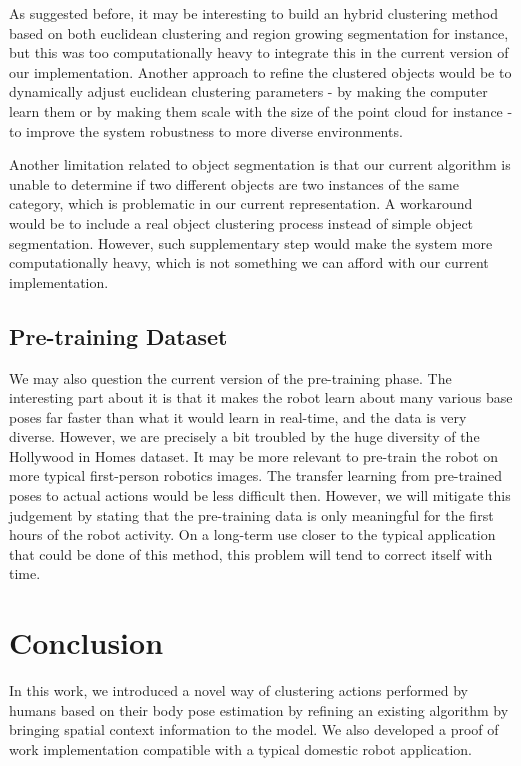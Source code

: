 As suggested before, it may be interesting to build an hybrid clustering method based on both euclidean clustering and region growing segmentation for instance, but this was too computationally heavy to integrate this in the current version of our implementation. Another approach to refine the clustered objects would be to dynamically adjust euclidean clustering parameters - by making the computer learn them or by making them scale with the size of the point cloud for instance - to improve the system robustness to more diverse environments.

Another limitation related to object segmentation is that our current algorithm is unable to determine if two different objects are two instances of the same category, which is problematic in our current representation. A workaround would be to include a real object clustering process instead of simple object segmentation. However, such supplementary step would make the system more computationally heavy, which is not something we can afford with our current implementation.

\subsection{Pre-training Dataset}
We may also question the current version of the pre-training phase. The interesting part about it is that it makes the robot learn about many various base poses far faster than what it would learn in real-time, and the data is very diverse. However, we are precisely a bit troubled by the huge diversity of the Hollywood in Homes dataset. It may be more relevant to pre-train the robot on more typical first-person robotics images. The transfer learning from pre-trained poses to actual actions would be less difficult then. However, we will mitigate this judgement by stating that the pre-training data is only meaningful for the first hours of the robot activity. On a long-term use closer to the typical application that could be done of this method, this problem will tend to correct itself with time.

\pagebreak
\section{Conclusion}
In this work, we introduced a novel way of clustering actions performed by humans based on their body pose estimation by refining an existing algorithm by bringing spatial context information to the model. We also developed a proof of work implementation compatible with a typical domestic robot application. 

